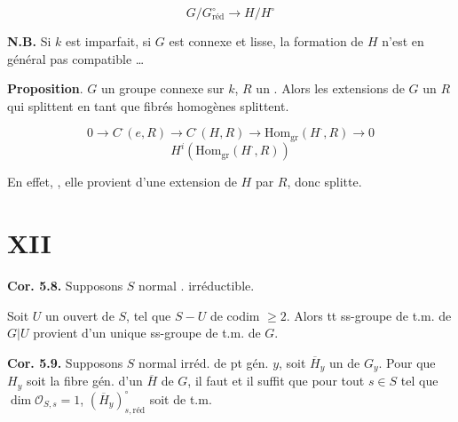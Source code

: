 \documentclass[11pt,a4paper]{article}
\begin{document}
\[
  G/G^{\circ}_{\mathrm{réd}} \to H/H^{\circ}
\]

\textbf{N.B.} Si $k$ est imparfait,  si $G$
 est connexe et lisse, la formation
de $H$ n'est en général pas compatible …

 \textbf{Proposition}. $G$ un groupe
connexe  sur $k$, $R$ un 
. Alors les extensions de $G$  un $R$
qui splittent en  tant que fibrés  homogènes
splittent.

\[
  0 \to C^{\cdot}(e, R) \to C^{\cdot}(H, R) \longrightarrow
  \mathrm{Hom}_{\mathrm{gr}}(H^{\cdot}, R) \to 0
\]
\[
  H^{i}(\mathrm{Hom}_{\mathrm{gr}}(H^{\cdot}, R))
\]

En effet,  \ill{} 
\ill{} \ill{} \add{\ill{}} \ill{} , elle provient d'une extension de $H$ par $R$, donc
splitte.

\section*{XII}



\textbf{Cor. 5.8.} Supposons $S$ normal .
 irréductible.

Soit $U$ un ouvert de $S$, tel que $S - U$ de codim $\geqslant 2$. Alors tt
\struck{\ill{}} ss-groupe de t.m. de $G|U$ provient d'un unique ss-groupe de
t.m. de $G$.

\textbf{Cor. 5.9.} Supposons $S$ normal  irréd. de
pt gén. $y$, soit $\overline{H}_y$ un 
 de $G_y$. Pour que $H_y$ soit la fibre
gén. d'un  
$\overline{H}$ de $G$, il faut et il suffit que pour tout $s \in S$ tel que
 $\dim \mathcal{O}_{S,s} = 1$,
$(\overline{H}_y)^{\circ}_{s, \mathrm{réd}}$ soit  de t.m.

\end{document}
